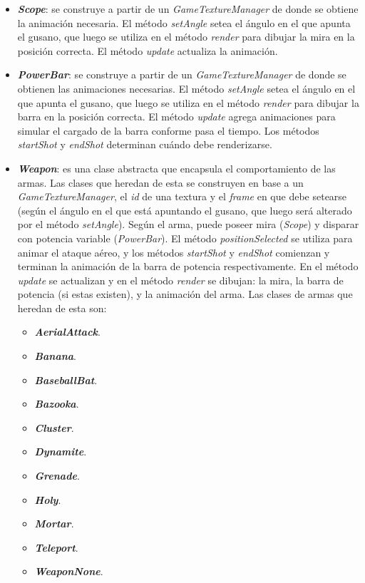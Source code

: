 \begin{itemize}
	\item \textbf{\textit{Scope}}: se construye a partir de un \textit{GameTextureManager} de donde se obtiene la animación necesaria. El método \textit{setAngle} setea el ángulo en el que apunta el gusano, que luego se utiliza en el método \textit{render} para dibujar la mira en la posición correcta. El método \textit{update} actualiza la animación.

	\item \textbf{\textit{PowerBar}}: se construye a partir de un \textit{GameTextureManager} de donde se obtienen las animaciones necesarias. El método \textit{setAngle} setea el ángulo en el que apunta el gusano, que luego se utiliza en el método \textit{render} para dibujar la barra en la posición correcta. El método \textit{update} agrega animaciones para simular el cargado de la barra conforme pasa el tiempo. Los métodos \textit{startShot} y \textit{endShot} determinan cuándo debe renderizarse.

	\item \textbf{\textit{Weapon}}: es una clase abstracta que encapsula el comportamiento de las armas. Las clases que heredan de esta se construyen en base a un \textit{GameTextureManager}, el \textit{id} de una textura y el \textit{frame} en que debe setearse (según el ángulo en el que está apuntando el gusano, que luego será alterado por el método \textit{setAngle}). Según el arma, puede poseer mira (\textit{Scope}) y disparar con potencia variable (\textit{PowerBar}). El método \textit{positionSelected} se utiliza para animar el ataque aéreo, y los métodos \textit{startShot} y \textit{endShot} comienzan y terminan la animación de la barra de potencia respectivamente. En el método \textit{update} se actualizan y en el método \textit{render} se dibujan: la mira, la barra de potencia (si estas existen), y la animación del arma. Las clases de armas que heredan de esta son:
	\begin{itemize}
		\item \textbf{\textit{AerialAttack}}.
		\item \textbf{\textit{Banana}}.
		\item \textbf{\textit{BaseballBat}}.
		\item \textbf{\textit{Bazooka}}.
		\item \textbf{\textit{Cluster}}.
		\item \textbf{\textit{Dynamite}}.
		\item \textbf{\textit{Grenade}}.
		\item \textbf{\textit{Holy}}.
		\item \textbf{\textit{Mortar}}.
		\item \textbf{\textit{Teleport}}.
		\item \textbf{\textit{WeaponNone}}.
	\end{itemize}


\end{itemize}

